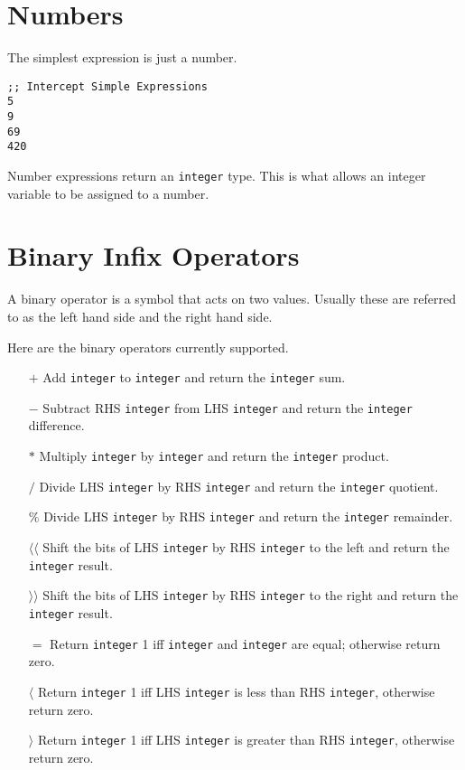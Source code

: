 \documentclass[12pt]{report}
\begin{document}
\section{Numbers}
\label{subsec:expressions-numbers}

The simplest expression is just a number.
\begin{Verbatim}[samepage=true]
;; Intercept Simple Expressions
5
9
69
420
\end{Verbatim}

Number expressions return an \verb|integer| type. This is what allows an integer variable to be assigned to a number.

\section{Binary Infix Operators}
\label{subsec:expressions-binops}

A binary operator is a symbol that acts on two values. Usually these are referred to as the left hand side and the right hand side.

Here are the binary operators currently supported.

\begin{itemize}

\item[$+$]
  Add \verb|integer| to \verb|integer| and return the \verb|integer| sum.
\item[$-$]
  Subtract RHS \verb|integer| from LHS \verb|integer| and return the \verb|integer| difference.
\item[$*$]
  Multiply \verb|integer| by \verb|integer| and return the \verb|integer| product.
\item[$/$]
 Divide LHS \verb|integer| by RHS \verb|integer| and return the \verb|integer| quotient.
\item[$\%$]
 Divide LHS \verb|integer| by RHS \verb|integer| and return the \verb|integer| remainder.

\item[$\langle\langle$]
 Shift the bits of LHS \verb|integer| by RHS \verb|integer| to the left and return the \verb|integer| result.
\item[$\rangle\rangle$]
 Shift the bits of LHS \verb|integer| by RHS \verb|integer| to the right and return the \verb|integer| result.

\item[$=$]
 Return \verb|integer| 1 iff \verb|integer| and \verb|integer| are equal; otherwise return zero.
\item[$\langle$]
 Return \verb|integer| 1 iff LHS \verb|integer| is less than RHS \verb|integer|, otherwise return zero.
\item[$\rangle$]
 Return \verb|integer| 1 iff LHS \verb|integer| is greater than RHS \verb|integer|, otherwise return zero.
\end{itemize}
\end{document}
